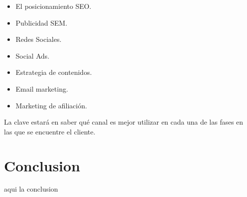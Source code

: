 \documentclass[preprint,12pt]{elsarticle}
\begin{document}
\begin{itemize}
\item El posicionamiento SEO.
\item Publicidad SEM.
\item Redes Sociales.
\item Social Ads.
\item Estrategia de contenidos.
\item Email marketing.
\item Marketing de afiliación.
\end{itemize}
La clave estará en saber qué canal es mejor utilizar en cada una de las fases en las que se encuentre el cliente.


	

	


	
	
\section{Conclusion}
aqui la conclusion

	
	

	
	
	\newpage
	
	
	
	
	
	
	
	
	
	
	
	
	
	
\end{document}
